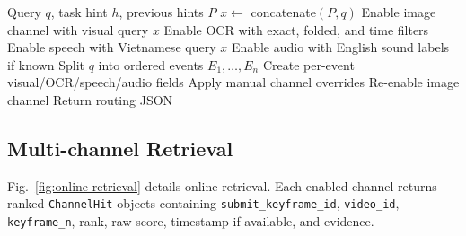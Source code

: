 \documentclass[conference]{IEEEtran}
\newcommand{\sid}{\texttt{submit\_keyframe\_id}}
\newcommand{\vid}{\texttt{video\_id}}
\newcommand{\kfn}{\texttt{keyframe\_n}}
\begin{document}
\begin{algorithm}[!t]
\caption{Heuristic query routing}
\label{alg:routing}
\footnotesize
\begin{algorithmic}[1]
\Require Query $q$, task hint $h$, previous hints $P$
\State $x \gets$ concatenate$(P,q)$
\State Enable image channel with visual query $x$
  \State Enable OCR with exact, folded, and time filters
\EndIf
{}
  \State Enable speech with Vietnamese query $x$
\EndIf
{}
  \State Enable audio with English sound labels if known
\EndIf
{}
  \State Split $q$ into ordered events $E_1,\ldots,E_n$
  \State Create per-event visual/OCR/speech/audio fields
\EndIf
\State Apply manual channel overrides
  \State Re-enable image channel
\EndIf
\State Return routing JSON
\end{algorithmic}
\end{algorithm}

\subsection{Multi-channel Retrieval}

Fig.~\ref{fig:online-retrieval} details online retrieval. Each enabled channel
returns ranked \texttt{ChannelHit} objects containing \sid{}, \vid{}, \kfn{},
rank, raw score, timestamp if available, and evidence.
\end{document}

